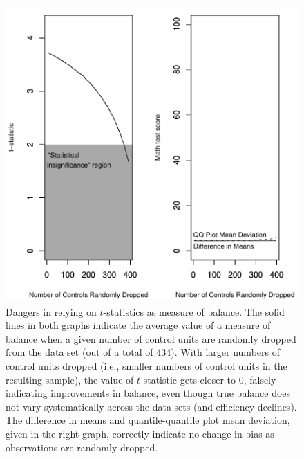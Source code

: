 \documentclass[11pt,titlepage]{article}
\begin{document}
\begin{figure}[t]
  \centering
  \includegraphics[height=4.5in]{figs/TStatPlotR0MATH}
  \caption{Dangers in relying on $t$-statistics as measure of balance.
    The solid lines in both graphs indicate the average value of a
    measure of balance when a given number of control units are
    randomly dropped from the data set (out of a total of 434).  With
    larger numbers of control units dropped (i.e., smaller numbers of
    control units in the resulting sample), the value of $t$-statistic
    gets closer to 0, falsely indicating improvements in balance, even
    though true balance does not vary systematically across the data
    sets (and efficiency declines).  The difference in means and
    quantile-quantile plot mean deviation, given in the right graph,
    correctly indicate no change in bias as observations are randomly
    dropped.}
  \label{f:randrop}
\end{figure}
\end{document}
